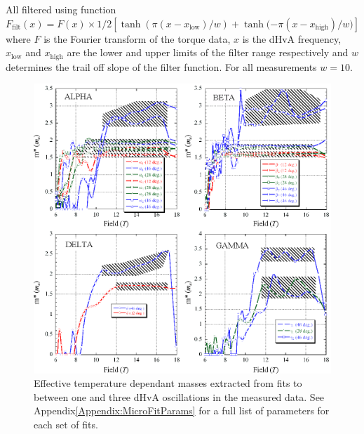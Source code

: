 All filtered using function $\textit{F}_{\textrm{filt}}(x) = \textit{F}(x) \times 1/2 [\tanh{(\pi(x - x_{\textrm{low}})/w)} + \tanh{(-\pi(x - x_{\textrm{high}})/w})]$ where $\textit{F}$ is the Fourier transform of the torque data, $x$ is the dHvA frequency, $x_{\textrm{low}}$ and $x_{\textrm{high}}$ are the lower and upper limits of the filter range respectively and $w$ determines the trail off slope of the filter function. For all measurements $w=10$.
\begin{figure}[htbp]
    \begin{center}
        \includegraphics[scale=0.7]{Chapter-dHvABaFe2P2/Figures/Mass/MicroFits/MicroFits}
        \caption{Effective temperature dependant masses extracted from fits to between one and three dHvA oscillations in the measured data. See Appendix\ref{Appendix:MicroFitParams} for a full list of parameters for each set of fits.}
        \label{Fig:ResD:MicroFits}
    \end{center}
\end{figure}
